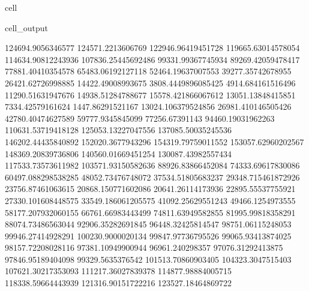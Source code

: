 \documentclass[letterpaper,10pt,english]{jupyterBook}
\begin{document}
\begin{sphinxuseclass}{cell}
\begin{sphinxVerbatimOutput}
\begin{sphinxuseclass}{cell_output}
\begin{sphinxVerbatim}[commandchars=\\\{\}]
124694.9056346577  124571.2213606769  122946.96419451728  119665.63014578054  114634.90812243936  107836.25445692486  99331.99367745934  89269.42059478417  77881.40410354578  65483.06192127118  52464.19637007553  39277.35742678955  26421.62726998885  14422.49008993675  3808.4449896085425  \PYGZhy{}4914.684161516496  \PYGZhy{}11290.51631947676  \PYGZhy{}14938.51284788677  \PYGZhy{}15578.421866067612  \PYGZhy{}13051.13848415851  \PYGZhy{}7334.42579161624  1447.86291521167  13024.106379524856  26981.410146505426  42780.40474627589  59777.9345845099  77256.67391143  94460.19031962263  110631.53719418128  125053.13227047556  137085.50035245536  146202.44435840892  152020.3677943296  154319.79759011552  153057.62960202567  148369.20839736806  140560.01669451254  130087.43982557434  117533.73573611982  103571.93150582636  88926.83866452084  74333.69617830086  60497.088298538285  48052.73476748072  37534.51805683237  29348.715461872926  23756.87461063615  20868.150771602086  20641.26114173936  22895.55537755921  27330.101608448575  33549.186061205575  41092.25629551243  49466.1254973555  58177.207932060155  66761.66983443499  74811.63949582855  81995.99818358291  88074.73486563044  92906.35282691845  96448.32425814547  98751.06115248053  99946.27414928291  100230.9000020134  99847.97736795526  99065.93413874025  98157.72208028116  97381.10949900944  96961.240298357  97076.31292413875  97846.95189404098  99329.5635376542  101513.70860903405  104323.3047515403  107621.30217353093  111217.36027839378  114877.98884005715  118338.59664443939  121316.90151722216  123527.18464869722  

\end{sphinxVerbatim}
\end{sphinxuseclass}
\end{sphinxVerbatimOutput}
\end{sphinxuseclass}
\end{document}
